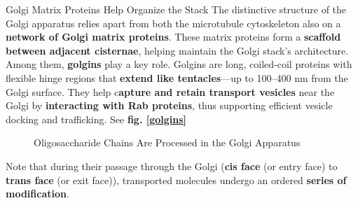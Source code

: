\documentclass[../main.tex]{subfiles}
\begin{document}
\begin{RemarkWithTitel}{Golgi Matrix Proteins Help Organize the Stack}
	The distinctive structure of the Golgi apparatus relies apart from both the microtubule cytoskeleton also on a \textbf{network of Golgi matrix proteins}. These matrix proteins form a \textbf{scaffold between adjacent cisternae}, helping maintain the Golgi stack’s architecture. Among them, \textbf{golgins} play a key role. Golgins are long, coiled-coil proteins with flexible hinge regions that \textbf{extend like tentacles}—up to 100–400 nm from the Golgi surface. They help c\textbf{apture and retain transport vesicles} near the Golgi by \textbf{interacting with Rab proteins}, thus supporting efficient vesicle docking and trafficking. See \textbf{fig. \ref{golgins}}
\end{RemarkWithTitel}

\begin{figure}[H]
	\centering
	\caption{Oligosaccharide Chains Are Processed in the Golgi Apparatus}
\end{figure}

Note that during their passage through the Golgi (\textbf{cis face} (or entry face) to \textbf{trans face} (or exit face)), transported molecules undergo an ordered \textbf{series of modification}.
\end{document}
